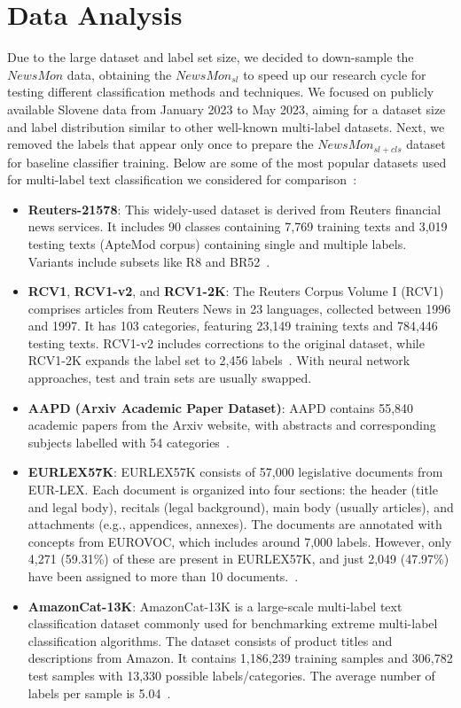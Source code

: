 \section{Data Analysis}

Due to the large dataset and label set size, we decided to down-sample the $NewsMon$ data, obtaining the $NewsMon_{sl}$ to speed up our research cycle for testing different classification methods and techniques.
We focused on publicly available Slovene data from January 2023 to May 2023, aiming for a dataset size and label distribution similar to other well-known multi-label datasets.
Next, we removed the labels that appear only once to prepare the $NewsMon_{sl+cls}$ dataset for baseline classifier training.
Below are some of the most popular datasets used for multi-label text classification we considered for comparison~\parencite{li2022surveytextclassification, tarekegn2024deeplearningmultilabellearning}:
\begin{itemize}
\item \textbf{Reuters-21578}: 
This widely-used dataset is derived from Reuters financial news services. 
It includes 90 classes containing 7,769 training texts and 3,019 testing texts (ApteMod corpus) containing single and multiple labels. 
Variants include subsets like R8 and BR52~\parencite{lewis1997reuters}.
\item \textbf{RCV1}, \textbf{RCV1-v2}, and \textbf{RCV1-2K}:
The Reuters Corpus Volume I (RCV1) comprises articles from Reuters News in 23 languages, collected between 1996 and 1997. 
It has 103 categories, featuring 23,149 training texts and 784,446 testing texts. RCV1-v2 includes corrections to the original dataset, while RCV1-2K expands the label set to 2,456 labels~\parencite{lewis2004rcv1}. With neural network approaches, test and train sets are usually swapped.
\item \textbf{AAPD (Arxiv Academic Paper Dataset)}: AAPD contains 55,840 academic papers from the Arxiv website, with abstracts and corresponding subjects labelled with 54 categories~\parencite{clement2019arxiv}.
\item \textbf{EURLEX57K}: EURLEX57K consists of 57,000 legislative documents from EUR-LEX. 
Each document is organized into four sections: the header (title and legal body), recitals (legal background), main body (usually articles), and attachments (e.g., appendices, annexes). 
The documents are annotated with concepts from EUROVOC, which includes around 7,000 labels. However, only 4,271 (59.31\%) of these are present in EURLEX57K, and just 2,049 (47.97\%) have been assigned to more than 10 documents.~\parencite{chalkidis-etal-2019-large}.
\item \textbf{AmazonCat-13K}: AmazonCat-13K is a large-scale multi-label text classification dataset commonly used for benchmarking extreme multi-label classification algorithms. The dataset consists of product titles and descriptions from Amazon. It contains 1,186,239 training samples and 306,782 test samples with 13,330 possible labels/categories. The average number of labels per sample is 5.04~\parencite{mcauley2013hidden}.
\end{itemize}

